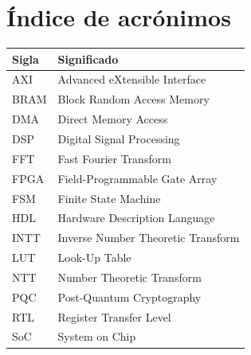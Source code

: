 \chapter*{Índice de acrónimos}
\begin{longtable}{@{}p{2.4cm}p{11.8cm}@{}}
\textbf{Sigla} & \textbf{Significado} \\ \midrule
\endhead
AXI & Advanced eXtensible Interface \\
BRAM & Block Random Access Memory \\
DMA & Direct Memory Access \\
DSP & Digital Signal Processing \\
FFT & Fast Fourier Transform \\
FPGA & Field-Programmable Gate Array \\
FSM & Finite State Machine \\
HDL & Hardware Description Language \\
INTT & Inverse Number Theoretic Transform \\
LUT & Look-Up Table \\
NTT & Number Theoretic Transform \\
PQC & Post-Quantum Cryptography \\
RTL & Register Transfer Level \\
SoC & System on Chip \\
\bottomrule
\end{longtable}
